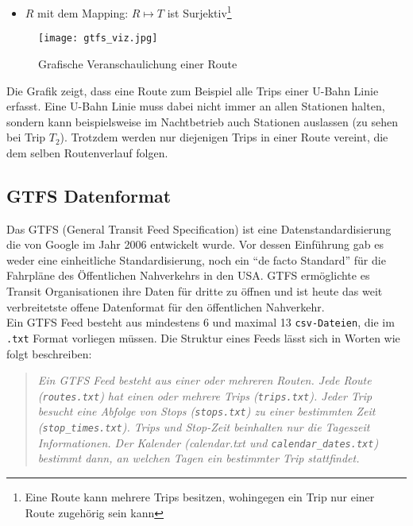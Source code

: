 \begin{newpage}
\begin{itemize}
        \item $R$ mit dem Mapping: $R \mapsto T$ ist Surjektiv\footnote{Eine Route kann mehrere Trips besitzen, wohingegen ein Trip nur einer Route zugehörig sein kann} 
      \end{itemize}     

      \begin{figure}[htbp]
        \begin{center}
          \texttt{[image: gtfs\_viz.jpg]}
          \caption{Grafische Veranschaulichung einer Route}
          \label{fig:gtfs_viz}
        \end{center}
      \end{figure}

      Die Grafik zeigt, dass eine Route zum Beispiel alle Trips einer U-Bahn Linie erfasst. Eine U-Bahn Linie muss dabei nicht immer an allen Stationen halten, sondern kann beispielsweise im Nachtbetrieb auch Stationen auslassen (zu sehen bei Trip $T_2$). Trotzdem werden nur diejenigen Trips in einer Route vereint, die dem selben Routenverlauf folgen.
      


	\subsection{GTFS Datenformat}
	\label{ssec:gtfs_datenformat}
		Das GTFS (General Transit Feed Specification) ist eine Datenstandardisierung die von Google im Jahr 2006 entwickelt wurde. Vor dessen Einführung gab es weder eine einheitliche Standardisierung, noch ein "`de facto Standard"' für die Fahrpläne des Öffentlichen Nahverkehrs in den USA. GTFS ermöglichte es Transit Organisationen ihre Daten für dritte zu öffnen und ist heute das weit verbreitetste offene Datenformat für den öffentlichen Nahverkehr.\parencite[S. 2]{roush}\\

    Ein GTFS Feed besteht aus mindestens 6 und maximal 13 \texttt{csv-Dateien}, die im \texttt{.txt} Format vorliegen müssen. Die Struktur eines Feeds lässt sich in Worten wie folgt beschreiben:

    \begin{quote}
      \textit{Ein GTFS Feed besteht aus einer oder mehreren Routen. Jede Route (\texttt{routes.txt}) hat einen oder mehrere Trips (\texttt{trips.txt}). Jeder Trip besucht eine Abfolge von Stops (\texttt{stops.txt}) zu einer bestimmten Zeit (\texttt{stop\_times.txt}). Trips und Stop-Zeit beinhalten nur die Tageszeit Informationen. Der Kalender (calendar.txt und \texttt{calendar\_dates.txt}) bestimmt dann, an welchen Tagen ein bestimmter Trip stattfindet.} \cite[S. 8]{zervaas}
    \end{quote}


\end{newpage}
